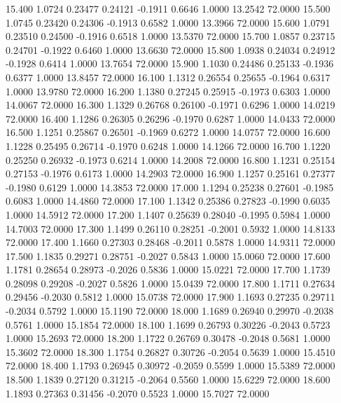   15.400   1.0724   0.23477   0.24121  -0.1911   0.6646   1.0000  13.2542  72.0000
  15.500   1.0745   0.23420   0.24306  -0.1913   0.6582   1.0000  13.3966  72.0000
  15.600   1.0791   0.23510   0.24500  -0.1916   0.6518   1.0000  13.5370  72.0000
  15.700   1.0857   0.23715   0.24701  -0.1922   0.6460   1.0000  13.6630  72.0000
  15.800   1.0938   0.24034   0.24912  -0.1928   0.6414   1.0000  13.7654  72.0000
  15.900   1.1030   0.24486   0.25133  -0.1936   0.6377   1.0000  13.8457  72.0000
  16.100   1.1312   0.26554   0.25655  -0.1964   0.6317   1.0000  13.9780  72.0000
  16.200   1.1380   0.27245   0.25915  -0.1973   0.6303   1.0000  14.0067  72.0000
  16.300   1.1329   0.26768   0.26100  -0.1971   0.6296   1.0000  14.0219  72.0000
  16.400   1.1286   0.26305   0.26296  -0.1970   0.6287   1.0000  14.0433  72.0000
  16.500   1.1251   0.25867   0.26501  -0.1969   0.6272   1.0000  14.0757  72.0000
  16.600   1.1228   0.25495   0.26714  -0.1970   0.6248   1.0000  14.1266  72.0000
  16.700   1.1220   0.25250   0.26932  -0.1973   0.6214   1.0000  14.2008  72.0000
  16.800   1.1231   0.25154   0.27153  -0.1976   0.6173   1.0000  14.2903  72.0000
  16.900   1.1257   0.25161   0.27377  -0.1980   0.6129   1.0000  14.3853  72.0000
  17.000   1.1294   0.25238   0.27601  -0.1985   0.6083   1.0000  14.4860  72.0000
  17.100   1.1342   0.25386   0.27823  -0.1990   0.6035   1.0000  14.5912  72.0000
  17.200   1.1407   0.25639   0.28040  -0.1995   0.5984   1.0000  14.7003  72.0000
  17.300   1.1499   0.26110   0.28251  -0.2001   0.5932   1.0000  14.8133  72.0000
  17.400   1.1660   0.27303   0.28468  -0.2011   0.5878   1.0000  14.9311  72.0000
  17.500   1.1835   0.29271   0.28751  -0.2027   0.5843   1.0000  15.0060  72.0000
  17.600   1.1781   0.28654   0.28973  -0.2026   0.5836   1.0000  15.0221  72.0000
  17.700   1.1739   0.28098   0.29208  -0.2027   0.5826   1.0000  15.0439  72.0000
  17.800   1.1711   0.27634   0.29456  -0.2030   0.5812   1.0000  15.0738  72.0000
  17.900   1.1693   0.27235   0.29711  -0.2034   0.5792   1.0000  15.1190  72.0000
  18.000   1.1689   0.26940   0.29970  -0.2038   0.5761   1.0000  15.1854  72.0000
  18.100   1.1699   0.26793   0.30226  -0.2043   0.5723   1.0000  15.2693  72.0000
  18.200   1.1722   0.26769   0.30478  -0.2048   0.5681   1.0000  15.3602  72.0000
  18.300   1.1754   0.26827   0.30726  -0.2054   0.5639   1.0000  15.4510  72.0000
  18.400   1.1793   0.26945   0.30972  -0.2059   0.5599   1.0000  15.5389  72.0000
  18.500   1.1839   0.27120   0.31215  -0.2064   0.5560   1.0000  15.6229  72.0000
  18.600   1.1893   0.27363   0.31456  -0.2070   0.5523   1.0000  15.7027  72.0000
